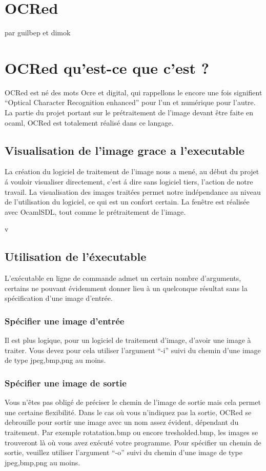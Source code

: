 \chapter{ OCRed }
par guilbep et dimok

\chapter{ OCRed qu'est-ce que c'est ? }
 OCRed est n\'e des mots Ocre et digital, qui rappellons le encore une fois
 signifient ``Optical Character Recognition enhanced'' pour l'un et
 num\'erique pour l'autre. La partie du projet portant sur le
 pr\'etraitement de l'image devant \^etre faite en ocaml, OCRed est
 totalement r\'ealis\'e dans ce langage.

\section{ Visualisation de l'image grace a l'executable }
 La cr\'eation du logiciel de traitement de l'image nous a men\'e, au
 d\'ebut du projet \'a vouloir visualiser directement, c'est \'a dire
 sans logiciel tiers, l'action de notre travail.
 La visualisation des images trait\'ees permet notre ind\'ependance
 au niveau de l'utilisation du logiciel, ce qui est un confort certain.
 La fen\^etre est r\'ealis\'ee avec OcamlSDL, tout comme le pr\'etraitement
 de l'image.

v\section{ Utilisation de l'\'executable }
 L'ex\'ecutable en ligne de commande admet un certain nombre d'arguments,
 certains ne pouvant \'evidemment donner lieu \`a un quelconque r\'esultat
 sans la sp\'ecification d'une image d'entr\'ee.
\subsection{ Sp\'ecifier une image d'entr\'ee }
 Il est plus logique, pour un logiciel de traitement d'image, d'avoir
 une image \`a traiter. Vous devez pour cela utiliser l'argument ``-i''
 suivi du chemin d'une image de type jpeg,bmp,png au moins.
\subsection{ Sp\'ecifier une image de sortie }
 Vous n'\^etes pas oblig\'e de pr\'eciser le chemin de l'image de sortie
 mais cela permet une certaine flexibilit\'e. Dans le cas o\`u vous
 n'indiquez pas la sortie, OCRed se debrouille pour sortir une image
 avec un nom assez \'evident, d\'ependant du traitement. Par exemple
 rotatation.bmp ou encore tresholded.bmp, les images se trouveront l\`a
 o\`u vous avez ex\'ecut\'e votre programme. Pour sp\'ecifier un chemin de
 sortie, veuillez utiliser l'argument ``-o'' suivi du chemin d'une image
de type jpeg,bmp,png au moins.
